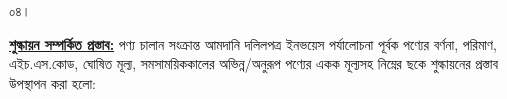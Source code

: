\documentclass[12pt]{article}
\newcommand{\ircno}{\jealirc}
\newcommand{\ircrenewdt}{৩০/০৬/২০২২ ইং}
\newcommand{\musokr}{ডিসেম্বর-২১}
\begin{document}
\begin{minipage}[t]{0.05\linewidth}
০৪।
\end{minipage}
\begin{minipage}[t]{0.95\linewidth}
\underline{\textbf{শুল্কায়ন সম্পর্কিত প্রস্তাব:}}
পণ্য চালান সংক্রান্ত আমদানি দলিলপত্র
ইনভয়েস পর্যালোচনা পূর্বক পণ্যের বর্ণনা, পরিমাণ, এইচ.এস.কোড, ঘোষিত মূল্য,
সমসাময়িককালের অভিন্ন/অনুরূপ পণ্যের একক মূল্যসহ নিম্নের ছকে শুল্কায়নের প্রস্তাব উপস্থাপন
করা হলো:
\end{minipage}
\end{document}
